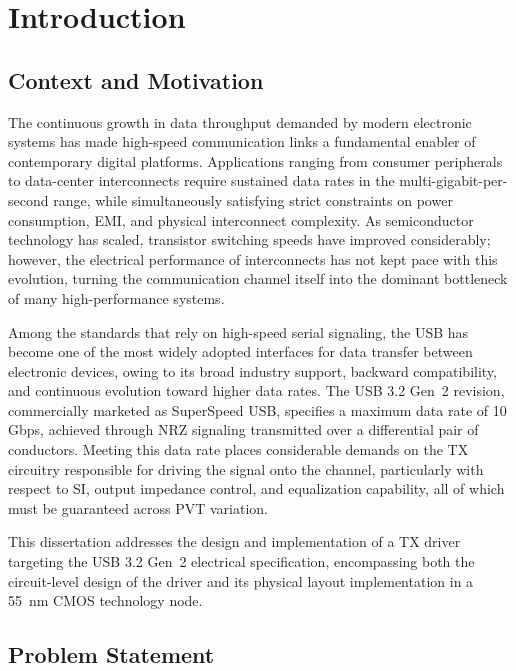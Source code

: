 \chapter{Introduction} \label{chap:ch1}

\section{Context and Motivation}

The continuous growth in data throughput demanded by modern electronic systems has made high-speed communication links a fundamental enabler of contemporary digital platforms. Applications ranging from consumer peripherals to data-center interconnects require sustained data rates in the multi-gigabit-per-second range, while simultaneously satisfying strict constraints on power consumption, \ac{EMI}, and physical interconnect complexity. As semiconductor technology has scaled, transistor switching speeds have improved considerably; however, the electrical performance of interconnects has not kept pace with this evolution, turning the communication channel itself into the dominant bottleneck of many high-performance systems.

Among the standards that rely on high-speed serial signaling, the \ac{USB} has become one of the most widely adopted interfaces for data transfer between electronic devices, owing to its broad industry support, backward compatibility, and continuous evolution toward higher data rates. The \ac{USB} 3.2 Gen~2 revision, commercially marketed as SuperSpeed \ac{USB}, specifies a maximum data rate of 10 Gbps, achieved through \ac{NRZ} signaling transmitted over a differential pair of conductors. Meeting this data rate places considerable demands on the \ac{TX} circuitry responsible for driving the signal onto the channel, particularly with respect to \ac{SI}, output impedance control, and equalization capability, all of which must be guaranteed across \ac{PVT} variation.

This dissertation addresses the design and implementation of a \ac{TX} driver targeting the \ac{USB} 3.2 Gen~2 electrical specification, encompassing both the circuit-level design of the driver and its physical layout implementation in a \SI{55}{\nano\meter} \ac{CMOS} technology node.

\section{Problem Statement}

